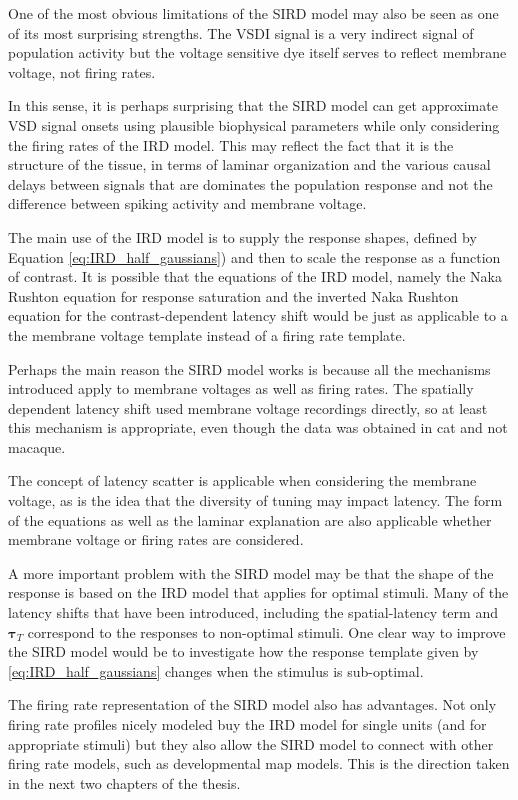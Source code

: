 \documentclass[phd,ianc,twoside]{infthesis}
\begin{document}
One of the most obvious limitations of the SIRD model may also be seen
as one of its most surprising strengths. The VSDI signal is a very
indirect signal of population activity but the voltage sensitive dye
itself serves to reflect membrane voltage, not firing rates.

In this sense, it is perhaps surprising that the SIRD model can get
approximate VSD signal onsets using plausible biophysical parameters
while only considering the firing rates of the IRD model. This may
reflect the fact that it is the structure of the tissue, in terms of
laminar organization and the various causal delays between signals that
are dominates the population response and not the difference between
spiking activity and membrane voltage.

The main use of the IRD model is to supply the response shapes, defined
by Equation \ref{eq:IRD_half_gaussians}) and then to scale the response
as a function of contrast. It is possible that the equations of the IRD
model, namely the Naka Rushton equation for response saturation and the
inverted Naka Rushton equation for the contrast-dependent latency shift
would be just as applicable to a the membrane voltage template instead
of a firing rate template.

Perhaps the main reason the SIRD model works is because all the
mechanisms introduced apply to membrane voltages as well as firing
rates. The spatially dependent latency shift used membrane voltage
recordings directly, so at least this mechanism is appropriate, even
though the data was obtained in cat and not macaque.

The concept of latency scatter is applicable when considering the
membrane voltage, as is the idea that the diversity of tuning may impact
latency. The form of the equations as well as the laminar explanation
are also applicable whether membrane voltage or firing rates are
considered.

A more important problem with the SIRD model may be that the shape of
the response is based on the IRD model that applies for optimal stimuli.
Many of the latency shifts that have been introduced, including the
spatial-latency term and $\pmb{\tau}_T$ correspond to the responses to
non-optimal stimuli.  One clear way to improve the SIRD model would be
to investigate how the response template given by
\ref{eq:IRD_half_gaussians} changes when the stimulus is sub-optimal.

The firing rate representation of the SIRD model also has
advantages. Not only firing rate profiles nicely modeled buy the IRD
model for single units (and for appropriate stimuli) but they also allow
the SIRD model to connect with other firing rate models, such as
developmental map models. This is the direction taken in the next two
chapters of the thesis.
\end{document}
